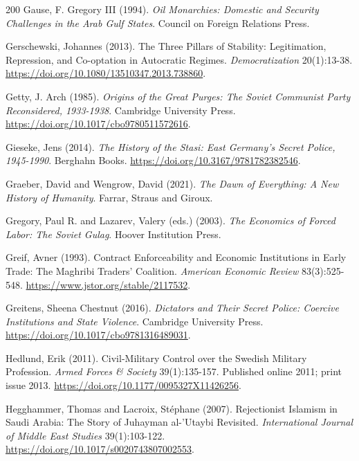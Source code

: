 \documentclass[11pt,letterpaper]{article}
\theoremstyle{definition}
\theoremstyle{remark}
\begin{document}
\begin{thebibliography}{200}
Gause, F. Gregory III (1994). \emph{Oil Monarchies: Domestic and Security Challenges in the Arab Gulf States}. Council on Foreign Relations Press.

Gerschewski, Johannes (2013). The Three Pillars of Stability: Legitimation, Repression, and Co-optation in Autocratic Regimes. \emph{Democratization} 20(1):13-38. \url{https://doi.org/10.1080/13510347.2013.738860}.

Getty, J. Arch (1985). \emph{Origins of the Great Purges: The Soviet Communist Party Reconsidered, 1933-1938}. Cambridge University Press. \url{https://doi.org/10.1017/cbo9780511572616}.

Gieseke, Jens (2014). \emph{The History of the Stasi: East Germany's Secret Police, 1945-1990}. Berghahn Books. \url{https://doi.org/10.3167/9781782382546}.

Graeber, David and Wengrow, David (2021). \emph{The Dawn of Everything: A New History of Humanity}. Farrar, Straus and Giroux.

Gregory, Paul R. and Lazarev, Valery (eds.) (2003). \emph{The Economics of Forced Labor: The Soviet Gulag}. Hoover Institution Press.

Greif, Avner (1993). Contract Enforceability and Economic Institutions in Early Trade: The Maghribi Traders' Coalition. \emph{American Economic Review} 83(3):525-548. \url{https://www.jstor.org/stable/2117532}.

Greitens, Sheena Chestnut (2016). \emph{Dictators and Their Secret Police: Coercive Institutions and State Violence}. Cambridge University Press. \url{https://doi.org/10.1017/cbo9781316489031}.

Hedlund, Erik (2011). Civil-Military Control over the Swedish Military Profession. \emph{Armed Forces \& Society} 39(1):135-157. Published online 2011; print issue 2013. \url{https://doi.org/10.1177/0095327X11426256}.

Hegghammer, Thomas and Lacroix, St\'ephane (2007). Rejectionist Islamism in Saudi Arabia: The Story of Juhayman al-'Utaybi Revisited. \emph{International Journal of Middle East Studies} 39(1):103-122. \url{https://doi.org/10.1017/s0020743807002553}.


\end{thebibliography}
\end{document}
